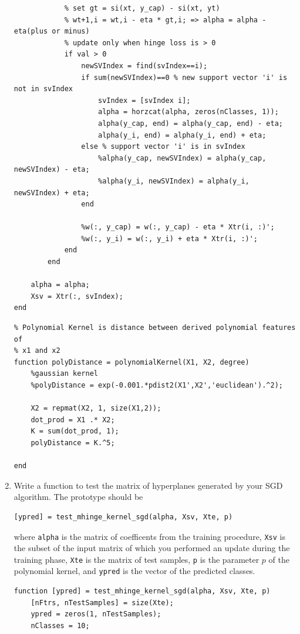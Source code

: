 \documentclass{article}
\begin{document}
\begin{enumerate}[label=(\alph*)]
\begin{verbatim}
            % set gt = si(xt, y_cap) - si(xt, yt)
            % wt+1,i = wt,i - eta * gt,i; => alpha = alpha - eta(plus or minus)
            % update only when hinge loss is > 0
            if val > 0 
                newSVIndex = find(svIndex==i);
                if sum(newSVIndex)==0 % new support vector 'i' is not in svIndex
                    svIndex = [svIndex i];
                    alpha = horzcat(alpha, zeros(nClasses, 1));
                    alpha(y_cap, end) = alpha(y_cap, end) - eta;
                    alpha(y_i, end) = alpha(y_i, end) + eta;
                else % support vector 'i' is in svIndex
                    %alpha(y_cap, newSVIndex) = alpha(y_cap, newSVIndex) - eta;
                    %alpha(y_i, newSVIndex) = alpha(y_i, newSVIndex) + eta;
                end
                
                %w(:, y_cap) = w(:, y_cap) - eta * Xtr(i, :)';
                %w(:, y_i) = w(:, y_i) + eta * Xtr(i, :)';     
            end
        end
    
    alpha = alpha;
    Xsv = Xtr(:, svIndex);    
end
\end{verbatim}

\begin{verbatim}
% Polynomial Kernel is distance between derived polynomial features of
% x1 and x2
function polyDistance = polynomialKernel(X1, X2, degree)
    %gaussian kernel
    %polyDistance = exp(-0.001.*pdist2(X1',X2','euclidean').^2);
    
    X2 = repmat(X2, 1, size(X1,2));
    dot_prod = X1 .* X2;
    K = sum(dot_prod, 1);
    polyDistance = K.^5;
        
end
\end{verbatim}

\item Write a function to test the matrix of hyperplanes generated by your SGD algorithm. The prototype should be
\begin{verbatim}
[ypred] = test_mhinge_kernel_sgd(alpha, Xsv, Xte, p)
\end{verbatim}
where \texttt{alpha} is the matrix of coefficents from the training procedure, \texttt{Xsv} is the subset of the input matrix of which you performed an update during the training phase, \texttt{Xte} is the matrix of test samples, \texttt{p} is the parameter $p$ of the polynomial kernel, and \texttt{ypred} is the vector of the predicted classes.
\begin{verbatim}
function [ypred] = test_mhinge_kernel_sgd(alpha, Xsv, Xte, p)
    [nFtrs, nTestSamples] = size(Xte);
    ypred = zeros(1, nTestSamples);
    nClasses = 10;
    

\end{verbatim}
\end{enumerate}
\end{document}
